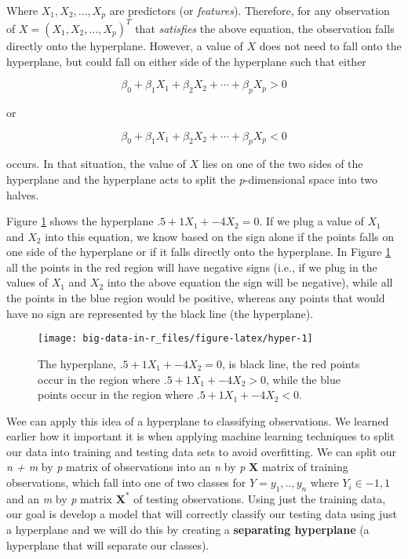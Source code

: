 \documentclass[
]{book}
\begin{document}
Where \(X_1, X_2, ..., X_p\) are predictors (or \emph{features}). Therefore, for any observation of \(X = (X_1, X_2, \dots, X_p)^T\) that \emph{satisfies} the above equation, the observation falls directly onto the hyperplane. However, a value of \(X\) does not need to fall onto the hyperplane, but could fall on either side of the hyperplane such that either

\[
\beta_0 + \beta_1X_1 + \beta_2X_2 + \cdots + \beta_pX_p > 0
\]

or

\[
\beta_0 + \beta_1X_1 + \beta_2X_2 + \cdots + \beta_pX_p < 0
\]

occurs. In that situation, the value of \(X\) lies on one of the two sides of the hyperplane and the hyperplane acts to split the \emph{p}-dimensional space into two halves.

Figure \ref{fig:hyper} shows the hyperplane \(.5 + 1X_1 + -4X_2 = 0\). If we plug a value of \(X_1\) and \(X_2\) into this equation, we know based on the sign alone if the points falls on one side of the hyperplane or if it falls directly onto the hyperplane. In Figure \ref{fig:hyper} all the points in the red region will have negative signs (i.e., if we plug in the values of \(X_1\) and \(X_2\) into the above equation the sign will be negative), while all the points in the blue region would be positive, whereas any points that would have no sign are represented by the black line (the hyperplane).

\begin{figure}
\texttt{[image: big-data-in-r\_files/figure-latex/hyper-1]} \caption{The hyperplane, $.5 + 1X_1 + -4X_2 = 0$, is black line, the red points occur in the region where $.5 + 1X_1 + -4X_2 > 0$, while the blue points occur in the region where $.5 + 1X_1 + -4X_2 < 0$.}\label{fig:hyper}
\end{figure}

Wee can apply this idea of a hyperplane to classifying observations. We learned earlier how it important it is when applying machine learning techniques to split our data into training and testing data sets to avoid overfitting. We can split our \emph{n + m} by \emph{p} matrix of observations into an \emph{n} by \emph{p} \(\mathbf{X}\) matrix of training observations, which fall into one of two classes for \(Y = y_1, .., y_n\) where \(Y_i \in {-1, 1}\) and an \emph{m} by \emph{p} matrix \(\mathbf{X^*}\) of testing observations. Using just the training data, our goal is develop a model that will correctly classify our testing data using just a hyperplane and we will do this by creating a \textbf{separating hyperplane} (a hyperplane that will separate our classes).
\end{document}
